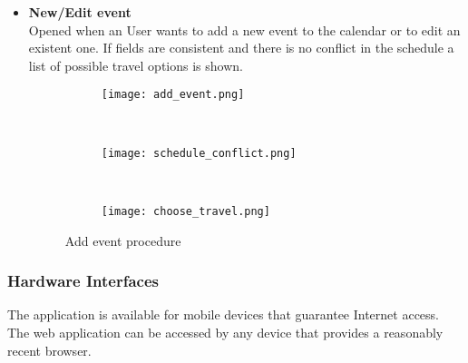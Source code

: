 \begin{itemize}
	\item \textbf{New/Edit event}\\
	Opened when an User wants to add a new event to the calendar or to edit an existent one. If fields are consistent and there is no conflict in the schedule a list of possible travel options is shown.
	\begin{figure}[H]
		\centering
		\begin{subfigure}{0.25\textwidth}
			\centering
			\texttt{[image: add\_event.png]}
		\end{subfigure}
		~
		\begin{subfigure}{0.25\textwidth}
			\centering
			\texttt{[image: schedule\_conflict.png]}
		\end{subfigure}
		~
		\begin{subfigure}{0.25\textwidth}
			\centering
			\texttt{[image: choose\_travel.png]}
		\end{subfigure}
	\caption{Add event procedure}
	\end{figure}

\end{itemize}
\subsubsection{Hardware Interfaces}
The application is available for mobile devices that guarantee Internet access. The web application can be accessed by any device that provides a reasonably recent browser.

